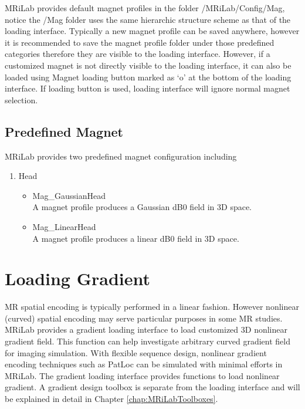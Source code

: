 \documentclass{book}%
\begin{document}
MRiLab provides default magnet profiles in the folder /MRiLab/Config/Mag, notice the /Mag folder uses the same hierarchic structure scheme as that of the loading interface. Typically a new magnet profile can be saved anywhere, however it is recommended to save the magnet profile folder under those predefined categories therefore they are visible to the loading interface. However, if a customized magnet is not directly visible to the loading interface, it can also be loaded using Magnet loading button marked as `o' at the bottom of the loading interface. If loading button is used, loading interface will ignore normal magnet selection.

\subsection{Predefined Magnet}

MRiLab provides two predefined magnet configuration including

\begin{enumerate}
		\item Head
		\begin{itemize}
			\item Mag\_GaussianHead \\
			A magnet profile produces a Gaussian dB0 field in 3D space.
			\item Mag\_LinearHead \\
			A magnet profile produces a linear dB0 field in 3D space.
		\end{itemize}

\end{enumerate}

\section{Loading Gradient}
MR spatial encoding is typically performed in a linear fashion. However nonlinear (curved) spatial encoding may serve particular purposes in some MR studies. MRiLab provides a gradient loading interface to load customized 3D nonlinear gradient field. This function can help investigate arbitrary curved gradient field for imaging simulation. With flexible sequence design, nonlinear gradient encoding techniques such as PatLoc can be simulated with minimal efforts in MRiLab. The gradient loading interface provides functions to load nonlinear gradient. A gradient design toolbox is separate from the loading interface and will be explained in detail in Chapter \ref{chap:MRiLabToolboxes}.
\end{document}
